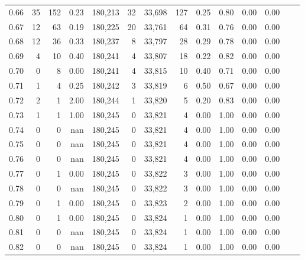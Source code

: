 \begin{tabular}{rrrrrrrrrrrrrr}
0.66 &      35 &    152 &    0.23 &  180,213 &       32 &  33,698 &     127 &  0.25 &  0.80 &  0.00 &      0.00 \\
0.67 &      12 &     63 &    0.19 &  180,225 &       20 &  33,761 &      64 &  0.31 &  0.76 &  0.00 &      0.00 \\
0.68 &      12 &     36 &    0.33 &  180,237 &        8 &  33,797 &      28 &  0.29 &  0.78 &  0.00 &      0.00 \\
0.69 &       4 &     10 &    0.40 &  180,241 &        4 &  33,807 &      18 &  0.22 &  0.82 &  0.00 &      0.00 \\
0.70 &       0 &      8 &    0.00 &  180,241 &        4 &  33,815 &      10 &  0.40 &  0.71 &  0.00 &      0.00 \\
0.71 &       1 &      4 &    0.25 &  180,242 &        3 &  33,819 &       6 &  0.50 &  0.67 &  0.00 &      0.00 \\
0.72 &       2 &      1 &    2.00 &  180,244 &        1 &  33,820 &       5 &  0.20 &  0.83 &  0.00 &      0.00 \\
0.73 &       1 &      1 &    1.00 &  180,245 &        0 &  33,821 &       4 &  0.00 &  1.00 &  0.00 &      0.00 \\
0.74 &       0 &      0 &     nan &  180,245 &        0 &  33,821 &       4 &  0.00 &  1.00 &  0.00 &      0.00 \\
0.75 &       0 &      0 &     nan &  180,245 &        0 &  33,821 &       4 &  0.00 &  1.00 &  0.00 &      0.00 \\
0.76 &       0 &      0 &     nan &  180,245 &        0 &  33,821 &       4 &  0.00 &  1.00 &  0.00 &      0.00 \\
0.77 &       0 &      1 &    0.00 &  180,245 &        0 &  33,822 &       3 &  0.00 &  1.00 &  0.00 &      0.00 \\
0.78 &       0 &      0 &     nan &  180,245 &        0 &  33,822 &       3 &  0.00 &  1.00 &  0.00 &      0.00 \\
0.79 &       0 &      1 &    0.00 &  180,245 &        0 &  33,823 &       2 &  0.00 &  1.00 &  0.00 &      0.00 \\
0.80 &       0 &      1 &    0.00 &  180,245 &        0 &  33,824 &       1 &  0.00 &  1.00 &  0.00 &      0.00 \\
0.81 &       0 &      0 &     nan &  180,245 &        0 &  33,824 &       1 &  0.00 &  1.00 &  0.00 &      0.00 \\
0.82 &       0 &      0 &     nan &  180,245 &        0 &  33,824 &       1 &  0.00 &  1.00 &  0.00 &      0.00 \\

\end{tabular}
